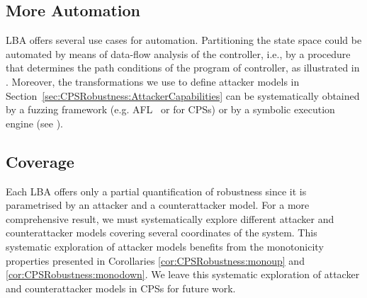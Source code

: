 {{\subsection{More Automation}
LBA offers several use cases for automation. Partitioning the state space could be automated by means of data-flow analysis of the controller, i.e., by a procedure that determines the path conditions of the program of controller, as illustrated in \cite{castellanos2021AttkFinder}. Moreover, the transformations we use to define attacker models in Section~\ref{sec:CPSRobustness:AttackerCapabilities} can be systematically obtained by a fuzzing framework (e.g. AFL~\cite{AFL} or \cite{chen2019learning} for CPSs) or by a symbolic execution engine (see \cite{castellanos2021AttkFinder}).


\subsection{Coverage}
Each LBA offers only a partial quantification of robustness since it is parametrised by an attacker and a counterattacker model. For a more comprehensive result, we must systematically explore different attacker and counterattacker models covering several coordinates of the system. This systematic exploration of attacker models benefits from the monotonicity properties presented in Corollaries \ref{cor:CPSRobustness:monoup} and \ref{cor:CPSRobustness:monodown}. We leave this systematic exploration of attacker and counterattacker models in CPSs for future work.


}}
